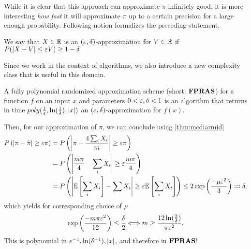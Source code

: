While it is clear that this approach can approximate $\pi$ infinitely good, it is more interesting
\emph{how fast} it will approximate $\pi$ up to a certain precision for a large enough probability.
Following notion formalizes the preceding statement.
\begin{definition}
    We say that $X \in \mathbb{R}$ is an $(\varepsilon, \delta)$-approximation for $V \in \mathbb{R}$
    if $P(|X-V| \leq \varepsilon V) \geq 1 - \delta$
\end{definition}
Since we work in the context of algorithms, we also introduce a new complexity class that is useful in this domain.
\begin{definition}
    A fully polynomial randomized approximation scheme (short: $\mathbf{FPRAS}$) for a function $f$
    on an input $x$ and parameters $0 < \varepsilon, \delta < 1$ is an algorithm
    that returns in time $poly(\frac{1}{\varepsilon}, \ln(\frac{1}{\delta}), |x|)$ an $(\varepsilon, \delta)$-approximation
    for $f(x)$.
\end{definition}
Then, for our approximation of $\pi$, we can conclude using \autoref{thm:mcdiarmid}
\begin{align*}
    P\left(\left|\pi - \tilde{\pi}\right| \geq \varepsilon \pi\right)
     & = P\left(\left|\pi - \frac{4\sum_i X_i}{m}\right| \geq \varepsilon \pi\right)                                                                                   \\
     & = P\left(\left|\frac{m \pi}{4} - \sum_i X_i\right| \geq \varepsilon \frac{m \pi}{4}\right)                                                                      \\
     & = P\left(\left|\mathbb{E}\left[\sum_i X_i\right] - \sum X_i\right| \geq \varepsilon \mathbb{E}\left[\sum_i X_i\right]\right) \leq 2\exp\left(\frac{-\mu \varepsilon^2}{3}\right) \eqqcolon \delta,
\end{align*}
which yields for corresponding choice of $\mu$
\begin{align}
    \exp\left(\frac{-m \pi \varepsilon^2}{12}\right) \leq \frac{\delta}{2} \Longleftrightarrow m \geq \frac{12 \ln(\frac{2}{\delta})}{\pi \varepsilon^2}.
\end{align}
This is polynomial in $\varepsilon^{-1}, \ln(\delta^{-1}), |x|$, and therefore in $\mathbf{FPRAS}$!

